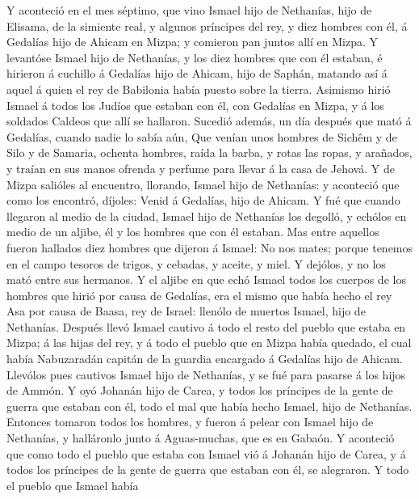  Y aconteció en el mes séptimo, que vino Ismael hijo de
Nethanías, hijo de Elisama, de la simiente real, y algunos príncipes del
rey, y diez hombres con él, á Gedalías hijo de Ahicam en Mizpa; y
comieron pan juntos allí en Mizpa.  Y levantóse Ismael
hijo de Nethanías, y los diez hombres que con él estaban, é hirieron á
cuchillo á Gedalías hijo de Ahicam, hijo de Saphán, matando así á aquel
á quien el rey de Babilonia había puesto sobre la tierra. 
Asimismo hirió Ismael á todos los Judíos que estaban con él, con
Gedalías en Mizpa, y á los soldados Caldeos que allí se hallaron.
 Sucedió además, un día después que mató á Gedalías,
cuando nadie lo sabía aún,  Que venían unos hombres de
Sichêm y de Silo y de Samaria, ochenta hombres, raída la barba, y rotas
las ropas, y arañados, y traían en sus manos ofrenda y perfume para
llevar á la casa de Jehová.  Y de Mizpa salióles al
encuentro, llorando, Ismael hijo de Nethanías: y aconteció que como los
encontró, díjoles: Venid á Gedalías, hijo de Ahicam.  Y
fué que cuando llegaron al medio de la ciudad, Ismael hijo de Nethanías
los degolló, y echólos en medio de un aljibe, él y los hombres que con
él estaban.  Mas entre aquellos fueron hallados diez
hombres que dijeron á Ismael: No nos mates; porque tenemos en el campo
tesoros de trigos, y cebadas, y aceite, y miel. Y dejólos, y no los mató
entre sus hermanos.  Y el aljibe en que echó Ismael todos
los cuerpos de los hombres que hirió por causa de Gedalías, era el mismo
que había hecho el rey Asa por causa de Baasa, rey de Israel: llenólo de
muertos Ismael, hijo de Nethanías.  Después llevó Ismael
cautivo á todo el resto del pueblo que estaba en Mizpa; á las hijas del
rey, y á todo el pueblo que en Mizpa había quedado, el cual había
Nabuzaradán capitán de la guardia encargado á Gedalías hijo de Ahicam.
Llevólos pues cautivos Ismael hijo de Nethanías, y se fué para pasarse á
los hijos de Ammón.  Y oyó Johanán hijo de Carea, y todos
los príncipes de la gente de guerra que estaban con él, todo el mal que
había hecho Ismael, hijo de Nethanías.  Entonces tomaron
todos los hombres, y fueron á pelear con Ismael hijo de Nethanías, y
halláronlo junto á Aguas-muchas, que es en Gabaón.  Y
aconteció que como todo el pueblo que estaba con Ismael vió á Johanán
hijo de Carea, y á todos los príncipes de la gente de guerra que estaban
con él, se alegraron.  Y todo el pueblo que Ismael había
